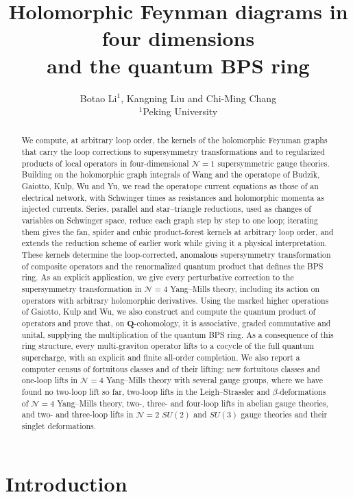 \documentclass[11pt]{article}
\title{Holomorphic Feynman diagrams in four dimensions\\ and the quantum BPS ring}
\author{Botao Li$^{1}$, Kangning Liu and Chi-Ming Chang\\[6pt]
{\normalsize $^{1}$Peking University}}
\date{}
\numberwithin{equation}{section}
\numberwithin{figure}{section}
\numberwithin{table}{section}
\begin{document}
\maketitle
\begin{abstract}
We compute, at arbitrary loop order, the kernels of the holomorphic Feynman graphs that carry the loop corrections to supersymmetry transformations and to regularized products of local operators in four-dimensional $\mathcal N=1$ supersymmetric gauge theories. Building on the holomorphic graph integrals of Wang and the operatope of Budzik, Gaiotto, Kulp, Wu and Yu, we read the operatope current equations as those of an electrical network, with Schwinger times as resistances and holomorphic momenta as injected currents. Series, parallel and star--triangle reductions, used as changes of variables on Schwinger space, reduce each graph step by step to one loop; iterating them gives the fan, spider and cubic product-forest kernels at arbitrary loop order, and extends the reduction scheme of earlier work while giving it a physical interpretation. These kernels determine the loop-corrected, anomalous supersymmetry transformation of composite operators and the renormalized quantum product that defines the BPS ring. As an explicit application, we give every perturbative correction to the supersymmetry transformation in $\mathcal N=4$ Yang--Mills theory, including its action on operators with arbitrary holomorphic derivatives. Using the marked higher operations of Gaiotto, Kulp and Wu, we also construct and compute the quantum product of operators and prove that, on $\mathbf Q$-cohomology, it is associative, graded commutative and unital, supplying the multiplication of the quantum BPS ring. As a consequence of this ring structure, every multi-graviton operator lifts to a cocycle of the full quantum supercharge, with an explicit and finite all-order completion. We also report a computer census of fortuitous classes and of their lifting: new fortuitous classes and one-loop lifts in $\mathcal N=4$ Yang--Mills theory with several gauge groups, where we have found no two-loop lift so far, two-loop lifts in the Leigh--Strassler and $\beta$-deformations of $\mathcal N=4$ Yang--Mills theory, two-, three- and four-loop lifts in abelian gauge theories, and two- and three-loop lifts in $\mathcal N=2$ $SU(2)$ and $SU(3)$ gauge theories and their singlet deformations.
\end{abstract}
{\small\setcounter{tocdepth}{2}\tableofcontents}
\bigskip

\section{Introduction}\label{sec-introduction}
\end{document}
